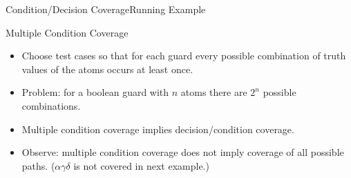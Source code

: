\begin{Frame}{Condition/Decision Coverage}{Running Example}
\end{Frame}

\begin{Frame}{Multiple Condition Coverage}
  \begin{itemize}
    \item Choose test cases so that for each guard every possible combination of truth values of the atoms occurs at least once.
    \item \alert{Problem}: for a boolean guard with $n$ atoms there are $2^n$
    possible combinations.
    \item Multiple condition coverage implies decision/condition coverage.
    \item \alert{Observe}: multiple condition coverage \alert{does not} imply coverage of all possible paths. ($\alpha\gamma\delta$ is not covered in next example.)
  \end{itemize}
\end{Frame}

